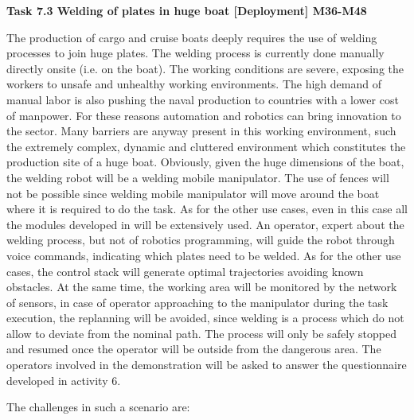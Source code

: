 \begin{longtable}[]
{\begin{minipage}[t]{\linewidth}
\textbf{Task 7.3 Welding of plates in huge boat {[}Deployment{]}
M36-M48}

The production of cargo and cruise boats deeply requires the use of
welding processes to join huge plates. The welding process is currently
done manually directly onsite (i.e. on the boat). The working conditions
are severe, exposing the workers to unsafe and unhealthy working
environments. The high demand of manual labor is also pushing the naval
production to countries with a lower cost of manpower. For these reasons
automation and robotics can bring innovation to the sector. Many
barriers are anyway present in this working environment, such the
extremely complex, dynamic and cluttered environment which constitutes
the production site of a huge boat. Obviously, given the huge dimensions
of the boat, the welding robot will be a welding mobile manipulator. The
use of fences will not be possible since welding mobile manipulator will
move around the boat where it is required to do the task. As for the
other use cases, even in this case all the modules developed in
 will be extensively used. An operator, expert about
the welding process, but not of robotics programming, will guide the
robot through voice commands, indicating which plates need to be welded.
As for the other use cases, the control stack will generate optimal
trajectories avoiding known obstacles. At the same time, the working
area will be monitored by the network of sensors, in case of operator
approaching to the manipulator during the task execution, the replanning
will be avoided, since welding is a process which do not allow to
deviate from the nominal path. The process will only be safely stopped
and resumed once the operator will be outside from the dangerous area.
The operators involved in the demonstration will be asked to answer the
questionnaire developed in activity 6.

The challenges in such a scenario are:


\end{minipage}}
\end{longtable}
